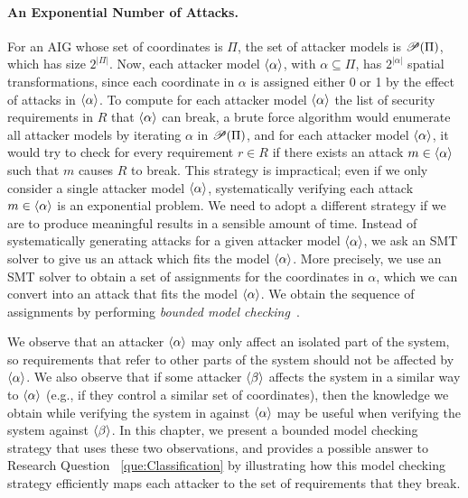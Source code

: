\paragraph{An Exponential Number of Attacks.} For an AIG whose set of coordinates is $\Pi$, the set of attacker models is ${{\mathscr{P}}\!\left({\Pi}\right)}$, which has size $2^{|\Pi|}$. Now, each attacker model ${{\left<\alpha\right>}}$, with $\alpha\subseteq \Pi$, has $2^{|\alpha|}$ spatial transformations, since each coordinate in $\alpha$ is assigned either 0 or 1 by the effect of attacks in ${{\left<\alpha\right>}}$. To compute for each attacker model ${{\left<\alpha\right>}}$ the list of security requirements in ${R}$ that ${{\left<\alpha\right>}}$ can break, a brute force algorithm would enumerate all attacker models by iterating $\alpha$ in ${{\mathscr{P}}\!\left({\Pi}\right)}$, and for each attacker model ${{\left<\alpha\right>}}$, it would try to check for every requirement $r\in {R}$ if there exists an attack $m\in {{\left<\alpha\right>}}$ such that $m$ causes $R$ to break. This strategy is impractical; even if we only consider a single attacker model ${{\left<\alpha\right>}}$, systematically verifying each attack $m\in {{\left<\alpha\right>}}$ is an exponential problem. We need to adopt a different strategy if we are to produce meaningful results in a sensible amount of time. Instead of systematically generating attacks for a given attacker model ${{\left<\alpha\right>}}$, we ask an SMT solver to give us an attack which fits the model ${{\left<\alpha\right>}}$. More precisely, we use an SMT solver to obtain a set of assignments for the coordinates in $\alpha$, which we can convert into an attack that fits the model ${{\left<\alpha\right>}}$. 
We obtain the sequence of assignments by performing \emph{bounded model checking}~\cite{BoundedModelChecking}. 
 
We observe that an attacker ${{\left<\alpha\right>}}$ may only affect an isolated part of the system, so requirements that refer to other parts of the system should not be affected by ${{\left<\alpha\right>}}$. We also observe that if some attacker ${{\left<\beta\right>}}$ affects the system in a similar way to ${{\left<\alpha\right>}}$ (e.g., if they control a similar set of coordinates), then the knowledge we obtain while verifying the system in against ${{\left<\alpha\right>}}$ may be useful when verifying the system against ${{\left<\beta\right>}}$. In this chapter, we present a bounded model checking strategy that uses these two observations, and provides a possible answer to Research Question ~\ref{que:Classification} by illustrating how this model checking strategy efficiently maps each attacker to the set of requirements that they break.

